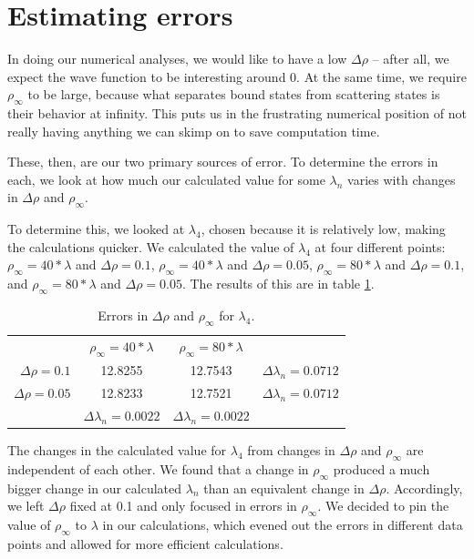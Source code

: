 \documentclass[12pt,twoside]{reedthesis}
\begin{document}
\section{Estimating errors}
In doing our numerical analyses, we would like to have a low $\Delta \rho$ -- after all, we expect the wave function to be interesting around 0. At the same time, we require $\rho_{\infty}$ to be large, because what separates bound states from scattering states is their behavior at infinity. This puts us in the frustrating numerical position of not really having anything we can skimp on to save computation time.

These, then, are our two primary sources of error. To determine the errors in each, we look at how much our calculated value for some $\lambda_{n}$ varies with changes in $\Delta \rho$ and $\rho_{\infty}$.  

To determine this, we looked at $\lambda_{4}$, chosen because it is relatively low, making the calculations quicker. We calculated the value of $\lambda_{4}$ at four different points: $\rho_{\infty} = 40*\lambda$ and $\Delta \rho = 0.1$, $\rho_{\infty} = 40*\lambda$ and $\Delta \rho = 0.05$, $\rho_{\infty} = 80*\lambda$ and $\Delta \rho = 0.1$, and $\rho_{\infty} = 80*\lambda$ and $\Delta \rho = 0.05$. The results of this are in table \ref{tab:errorchanges}. 
\begin{table}
\centering
\begin{tabular}{r|c|c|c|}
\multicolumn{1}{r}{}
 &  \multicolumn{1}{c}{$\rho_{\infty} = 40*\lambda$}
 & \multicolumn{1}{c}{$\rho_{\infty} = 80*\lambda$}
 & \multicolumn{1}{l}{} \\
\cline{2-4}
$\Delta \rho = 0.1$ & 12.8255 & 12.7543 & $\Delta \lambda_n = 0.0712$\\
\cline{2-4}
$\Delta \rho = 0.05$ & 12.8233 & 12.7521& $\Delta \lambda_n = 0.0712$ \\
\cline{2-4}
\multicolumn{1}{r}{}
 &  \multicolumn{1}{|c|}{$\Delta \lambda_n = 0.0022$}
 & \multicolumn{1}{c|}{$\Delta \lambda_n = 0.0022$}
 & \multicolumn{1}{l}{} \\
 \cline{2-3}
\end{tabular}
\caption{Errors in $\Delta \rho$ and $\rho_{\infty}$ for $\lambda_4$.}
\label{tab:errorchanges}
\end{table}
The changes in the calculated value for $\lambda_4$ from changes in $\Delta \rho$ and $\rho_{\infty}$ are independent of each other. We found that a change in $\rho_{\infty}$ produced a much bigger change in our calculated $\lambda_{n}$ than an equivalent change in $\Delta \rho$. Accordingly, we left $\Delta \rho$ fixed at 0.1 and only focused in errors in $\rho_{\infty}$. We decided to pin the value of $\rho_{\infty}$ to $\lambda$ in our calculations, which evened out the errors in different data points and allowed for more efficient calculations.
\end{document}
